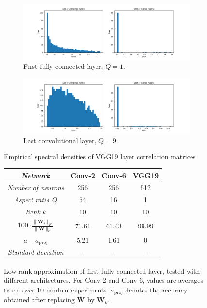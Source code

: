 \begin{figure}[H]
\centering
\begin{subfigure}[b]{\textwidth}
   \includegraphics[width=1\linewidth]{images/vgg-fc1-svd-comp.png}
   \caption{First fully connected layer, $Q = 1$.}
   \label{fig:vgg-conv16-svd-comp}
\end{subfigure}

\begin{subfigure}[b]{\textwidth}
   \includegraphics[width=1\linewidth]{images/vgg-conv16-svd-comp.png}
   \caption{Last convolutional layer, $Q = 9$.}
   \label{fig:vgg-conv16-svd-comp} 
\end{subfigure}
\caption{Empirical spectral densities of VGG19 layer correlation matrices}
\end{figure}

\begin{figure}[h]
\centering
\scalebox{0.9}
{\begin{tabular}{SSSS} \toprule
    {\textit{Network}} & {Conv-2} & {Conv-6} & {VGG19} \\ \midrule
	{\textit{Number of neurons}} & {256} & {256} & {512} \\    
    {\textit{Aspect ratio Q}} & {64} & {16} & {1} \\
    {\textit{Rank} $k$} & {10} & {10} & {10} \\
    {$100 \cdot \frac{ \| \mathbf{W}_k \|_F }{ \| \mathbf{W} \|_F }$}  & {71.61} & {61.43} & {99.99} \\
    {$a - a_{\text{proj}}$}  & {5.21} & {1.61} & {0} \\
    {\textit{Standard deviation}} & {\textbf{--}} & {\textbf{--}} & {\textbf{--}}\\ \bottomrule
\end{tabular}}
\caption{Low-rank approximation of first fully connected layer, tested with different architectures. For Conv-2 and Conv-6, values are averages taken over 10 random experiments. $a_{\text{proj}}$ denotes the accuracy obtained after replacing $\mathbf{W}$ by $\mathbf{W}_k$.}
\label{fig:low-rank}
\end{figure}

